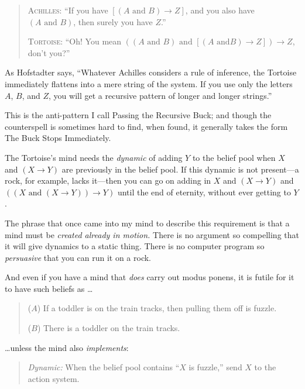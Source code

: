 \begin{quotation}
{
 \textsc{Achilles}: ``If you have $[(A\text{ and }B) \rightarrow 
Z]$, and you also have $(A\text{ and }B)$, then surely you have
$Z$.''}

{
 \textsc{Tortoise}: ``Oh! You mean $((A\text{ and }B)\text{ and }[(A\text{ and
}B) \rightarrow  Z]) \rightarrow  Z$, don't
 you?''}
\end{quotation}

{
 As Hofstadter says, ``Whatever Achilles considers
a rule of inference, the Tortoise immediately flattens into a mere
string of the system. If you use only the letters $A$, $B$, and $Z$, you will
get a recursive pattern of longer and longer
strings.''}

{
 This is the anti-pattern I call Passing the Recursive Buck; and
though the counterspell is sometimes hard to find, when found, it
generally takes the form The Buck Stops Immediately.}

{
 The Tortoise's mind needs the \textit{dynamic} of
adding $Y$ to the belief pool when $X$ and $(X \rightarrow Y)$ are
previously in the belief pool. If this dynamic is not present---a rock,
for example, lacks it---then you can go on adding in $X$ and $(X
\rightarrow  Y)$ and $((X\text{ and }(X \rightarrow  Y)) \rightarrow  Y)$
until the end of eternity, without ever getting to $Y$.}

{
 The phrase that once came into my mind to describe this
requirement is that a mind must be \textit{created already in motion.}
There is no argument so compelling that it will give dynamics to a
static thing. There is no computer program so \textit{persuasive} that
you can run it on a rock.}

{
 And even if you have a mind that \textit{does} carry out modus
ponens, it is futile for it to have such beliefs as \ldots}

\begin{quotation}
{
 ($A$) If a toddler is on the train tracks, then pulling them off is
fuzzle.}

{
  ($B$) There is a toddler on the train tracks.}
\end{quotation}

{
 \ldots unless the mind also \textit{implements}:}

\begin{quotation}
{
 \textit{Dynamic:} When the belief pool contains
``$X$ is fuzzle,'' send $X$ to the
 action system.}
\end{quotation}

